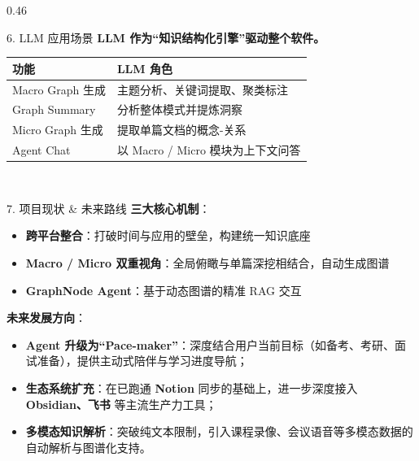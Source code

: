 \documentclass[final]{beamer}
\begin{document}
\begin{frame}[t]
\begin{columns}[t]
\begin{column}{0.46\paperwidth}
\begin{block}{6. LLM 应用场景}
\textbf{LLM 作为“知识结构化引擎”驱动整个软件。}\\[0.3cm]
\centering
{\fontsize{28pt}{38pt}\selectfont
\begin{tabular}{l|l}
\toprule
\textbf{功能} & \textbf{LLM 角色} \\
\midrule
Macro Graph 生成 & 主题分析、关键词提取、聚类标注 \\
Graph Summary   & 分析整体模式并提炼洞察 \\
Micro Graph 生成 & 提取单篇文档的概念-关系 \\
Agent Chat      & 以 Macro / Micro 模块为上下文问答 \\
\bottomrule
\end{tabular}}\\[0.15cm]
\end{block}

\begin{block}{7. 项目现状 \& 未来路线}
\textbf{三大核心机制}：
\begin{itemize}
    \item \textbf{跨平台整合}：打破时间与应用的壁垒，构建统一知识底座
    \item \textbf{Macro / Micro 双重视角}：全局俯瞰与单篇深挖相结合，自动生成图谱
    \item \textbf{GraphNode Agent}：基于动态图谱的精准 RAG 交互
\end{itemize}
\vspace{0.2cm}
\textbf{未来发展方向}：
\begin{itemize}
    \item \textbf{Agent 升级为“Pace-maker”}：深度结合用户当前目标（如备考、考研、面试准备），提供主动式陪伴与学习进度导航；
    \item \textbf{生态系统扩充}：在已跑通 \textbf{Notion} 同步的基础上，进一步深度接入 \textbf{Obsidian、飞书} 等主流生产力工具；
    \item \textbf{多模态知识解析}：突破纯文本限制，引入课程录像、会议语音等多模态数据的自动解析与图谱化支持。
\end{itemize}
\end{block}

\end{column}
\end{columns}

\end{frame}
\end{document}
